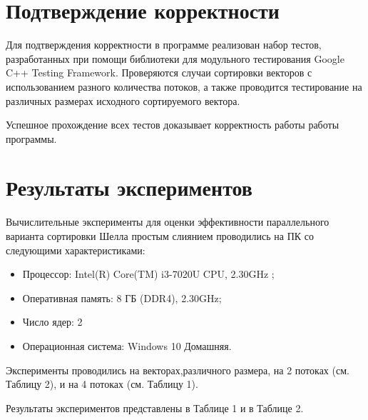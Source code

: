 \documentclass{report}
\begin{document}
\newpage

\section*{Подтверждение корректности}
Для подтверждения корректности в программе реализован набор тестов, разработанных при помощи библиотеки для модульного тестирования Google C++ Testing Framework. Проверяются случаи сортировки векторов с использованием разного количества потоков, а также проводится тестирование на различных размерах исходного сортируемого вектора.
\par Успешное прохождение всех тестов доказывает корректность работы работы программы.

\newpage

\section*{Результаты экспериментов}
Вычислительные эксперименты для оценки эффективности параллельного варианта
сортировки Шелла простым слиянием проводились на ПК со следующими характеристиками:
\begin{itemize}
\item Процессор: Intel(R) Core(TM) i3-7020U CPU, 2.30GHz ;
\item Оперативная память: 8 ГБ (DDR4), 2.30GHz;
\item Число ядер: 2
\item Операционная система: Windows 10 Домашняя.
\end{itemize}

\par Эксперименты проводились на векторах,различного размера, на 2 потоках (см. Таблицу 2), и на 4 потоках (см. Таблицу 1).

\par Результаты экспериментов представлены в Таблице 1 и в Таблице 2.
\end{document}
